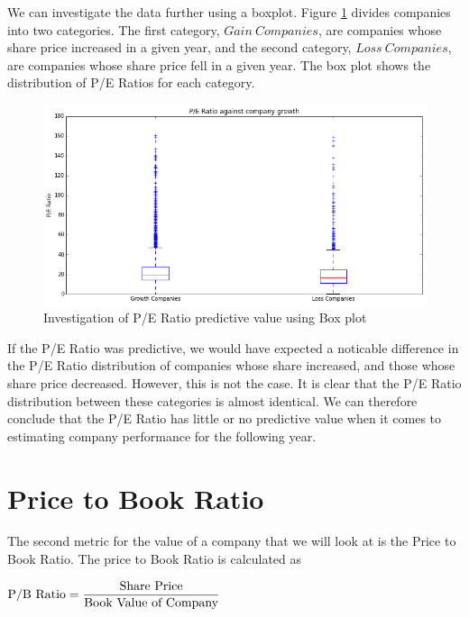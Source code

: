 \documentclass{report}
\begin{document}
We can investigate the data further using a boxplot. Figure \ref{fig:pe-box} divides companies into two categories. The first category, $Gain\ Companies$, are companies whose share price increased in a given year, and the second category, $Loss\ Companies$, are companies whose share price fell in a given year. The box plot shows the distribution of P/E Ratios for each category.

\begin{figure}[H]
	\caption{Investigation of P/E Ratio predictive value using Box plot}
	\centerline{\includegraphics[width=\textwidth]{vis/pe_box.png}}
	\label{fig:pe-box}
\end{figure}

If the P/E Ratio was predictive, we would have expected a noticable difference in the P/E Ratio distribution of companies whose share increased, and those whose share price decreased. However, this is not the case. It is clear that the P/E Ratio distribution between these categories is almost identical. We can therefore conclude that the P/E Ratio has little or no predictive value when it comes to estimating company performance for the following year.

\section{Price to Book Ratio}

The second metric for the value of a company that we will look at is the Price to Book Ratio. The price to Book Ratio is calculated as

\begin{math}
  \\
	\text{P/B Ratio} = \dfrac{\text{Share Price}}{\text{Book Value of Company}}
	\\
\end{math}
\end{document}
